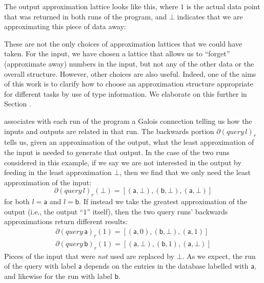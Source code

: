 \begin{example}
\begin{center}
  \end{center}
  The output approximation lattice looks like this, where $1$ is the actual data point that was returned in both runs of the program, and $\bot$ indicates that we are approximating this piece of data away:
  \begin{center}
  \end{center}
  These are not the only choices of approximation lattices that we could have taken. For the input, we have chosen a lattice that allows us to ``forget'' (approximate away) numbers in the input, but not any of the other data or the overall structure. However, other choices are also useful. Indeed, one of the aims of this work is to clarify how to choose an approximation structure appropriate for different tasks by use of type information. We elaborate on this further in Section .

  \GPS associates with each run of the program a Galois connection telling us how the inputs and outputs are related in that run. The backwards portion $\partial (\mathit{query}\,l)_r$ tells us, given an approximation of the output, what the least approximation of the input is needed to generate that output. In the case of the two runs considered in this example, if we say we are not interested in the output by feeding in the least approximation $\bot$, then we find that we only need the least approximation of the input:
  \begin{displaymath}
    \partial (\mathit{query}\,l)_r(\bot) = [(\mathsf{a},\bot), (\mathsf{b}, \bot), (\mathsf{a}, \bot)]
  \end{displaymath}
  for both $l = \mathsf{a}$ and $l = \mathsf{b}$. If instead we take the greatest approximation of the output (i.e., the output ``$1$'' itself), then the two query runs' backwards approximations return different results:
  \begin{displaymath}
    \begin{array}{l}
      \partial (\mathit{query}\,\mathsf{a})_r(1) = [(\mathsf{a},0), (\mathsf{b},\bot), (\mathsf{a},1)] \\
      \partial (\mathit{query}\,\mathsf{b})_r(1) = [(\mathsf{a},\bot), (\mathsf{b},1), (\mathsf{a},\bot)]
    \end{array}
  \end{displaymath}
  Pieces of the input that were {\em not} used are replaced by $\bot$. As we expect, the run of the query with label $\mathsf{a}$ depends on the entries in the database labelled with $\mathsf{a}$, and likewise for the run with label $\mathsf{b}$.


\end{example}
